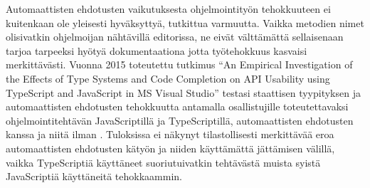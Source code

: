 Automaattisten ehdotusten vaikutuksesta ohjelmointityön tehokkuuteen ei
kuitenkaan ole yleisesti hyväksyttyä, tutkittua varmuutta. Vaikka metodien
nimet olisivatkin ohjelmoijan nähtävillä editorissa, ne eivät välttämättä
sellaisenaan tarjoa tarpeeksi hyötyä dokumentaationa jotta työtehokkuus
kasvaisi merkittävästi. Vuonna 2015 toteutettu tutkimus
``An Empirical Investigation of the Effects of Type Systems and Code Completion
on API Usability using TypeScript and JavaScript in MS Visual Studio''
testasi staattisen tyypityksen ja automaattisten ehdotusten tehokkuutta
antamalla osallistujille toteutettavaksi ohjelmointitehtävän JavaScriptillä
ja TypeScriptillä, automaattisten ehdotusten kanssa ja niitä ilman
\cite{EmpiricalInvestigationOfCodeCompletion}. Tuloksissa ei näkynyt
tilastollisesti merkittävää eroa automaattisten ehdotusten kätyön ja niiden
käyttämättä jättämisen välillä, vaikka TypeScriptiä käyttäneet suoriutuivatkin
tehtävästä muista syistä JavaScriptiä käyttäneitä tehokkaammin.